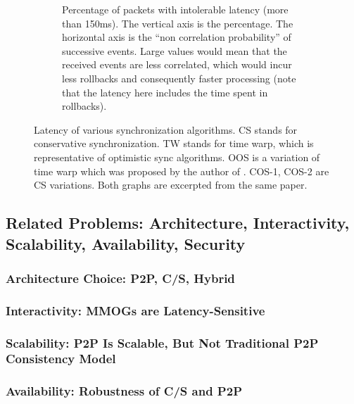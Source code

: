 \documentclass{article}
\begin{document}
\begin{figure}
\begin{center}
\begin{subfigure}[b]{\textwidth}
\begin{center}
	\caption{Percentage of packets with intolerable latency (more than 150ms). The vertical axis is the percentage. The horizontal axis is the ``non correlation probability'' of successive events. Large values would mean that the received events are less correlated, which would incur less rollbacks and consequently faster processing (note that the latency here includes the time spent in rollbacks).}
	\label{fig:sapct}
	\end{center}
\end{subfigure}
\caption{Latency of various synchronization algorithms. CS stands for conservative synchronization. TW stands for time warp, which is representative of optimistic sync algorithms. OOS is a variation of time warp which was proposed by the author of \cite{Ferretti05}. COS-1, COS-2 are CS variations. Both graphs are excerpted from the same paper.}
\label{fig:sa}
\end{center}
\end{figure}


\subsection{Related Problems: Architecture, Interactivity, Scalability, Availability, Security}
\label{sec:rp}

\subsubsection{Architecture Choice: P2P, C/S, Hybrid}
\label{sec:arch}

\subsubsection{Interactivity: MMOGs are Latency-Sensitive}

\subsubsection{Scalability: P2P Is Scalable, But Not Traditional P2P Consistency Model}

\subsubsection{Availability: Robustness of C/S and P2P}
\end{document}
